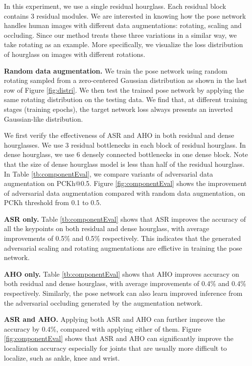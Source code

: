 \documentclass[10pt,twocolumn,letterpaper]{article}
\begin{document}
In this experiment, we use a single residual hourglass. Each residual block contains 3 residual modules.
We are interested in knowing how the pose network handles human images with different data augmentations: rotating, scaling and occluding. Since our method treats these three variations in a similar way, we take rotating as an example. More specifically, we visualize the loss distribution of hourglass on images with different rotations.

{\bf Random data augmentation.} We train the pose network using random rotating sampled from a zero-centered Gaussian distribution as shown in the last row of Figure \ref{fig:distri}. We then test the trained pose network by applying the same rotating distribution on the testing data. We find that, at different training stages (training epochs), the target network loss always presents an inverted Gaussian-like distribution. 



We first verify the effectiveness of ASR and AHO in both residual and dense hourglasses. We use 3 residual bottlenecks in each block of residual hourglass. In dense hourglass, we use 6 densely connected bottlenecks in one dense block. Note that the size of dense hourglass model is less than half of the residual hourglass. In Table \ref{tb:componentEval}, we compare variants of adversarial data augmentation on PCKh@0.5. Figure \ref{fig:componentEval} shows the improvement of adversarial data augmentation compared with random data augmentation, on PCKh threshold from 0.1 to 0.5.

{\bf ASR only.} Table \ref{tb:componentEval} shows that ASR %
improves the accuracy of all the keypoints on both residual and dense hourglass, with average improvements of 0.5\% and 0.5\% respectively. This indicates that the generated adversarial scaling and rotating augmentations are effictive in training the pose network. 

{\bf AHO only.} Table \ref{tb:componentEval} shows that AHO %
improves accuracy on both residual and dense hourglass, with average improvements of 0.4\% and 0.4\% respectively. Similarly, the pose network can also learn improved inference from the adversarial occluding generated by the augmentation network.

{\bf ASR and AHO.} Applying both ASR and AHO can further improve the accuracy by 0.4\%, compared with applying either of them. Figure \ref{fig:componentEval} shows that ASR and AHO can significantly improve the localization accuracy especially for joints that are usually more difficult to localize, such as ankle, knee and wrist. 
\end{document}
